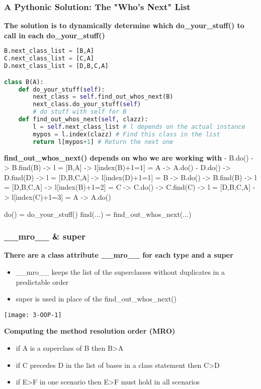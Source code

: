 \subsubsection{A Pythonic Solution: The "Who's Next" List}
\textbf{The solution is to dynamically determine which do\_your\_stuff() to call in each do\_your\_stuff()}

\begin{lstlisting}[language=Python]
B.next_class_list = [B,A]
C.next_class_list = [C,A]
D.next_class_list = [D,B,C,A]

class B(A):
	def do_your_stuff(self):
		next_class = self.find_out_whos_next(B)
		next_class.do_your_stuff(self)
		# do stuff with self for B
	def find_out_whos_next(self, clazz):
		l = self.next_class_list # l depends on the actual instance
		mypos = l.index(clazz) # Find this class in the list
		return l[mypos+1] # Return the next one
\end{lstlisting}

\textbf{find\_out\_whos\_next() depends on who we are working with}
- B.do() -> B.find(B) -> l = [B,A] ->  l[index(B)+1=1] = A ->  A.do()
- D.do() -> D.find(D) -> l = [D,B,C,A] -> l[index(D)+1=1] = B -> B.do()
         -> B.find(B) -> l = [D,B,C,A] -> l[index(B)+1=2] = C -> C.do()
         -> C.find(C) -> l = [D,B,C,A] -> l[index(C)+1=3] = A -> A.do()

do() = do\_your\_stuff() find(...) = find\_out\_whos\_next(...)

\subsubsection{\_\_mro\_\_ \& super}
\textbf{There are a class attribute \_\_mro\_\_ for each type and a super}
\begin{itemize}
	\item \_\_mro\_\_ keeps the list of the superclasses without duplicates in a
predictable order
	\item super is used in place of the find\_out\_whos\_next()
\end{itemize}

\begin{center}
\texttt{[image: 3-OOP-1]}
\end{center}

\textbf{Computing the method resolution order (MRO)}
\begin{itemize}
	\item if A is a superclass of B then B>A
	\item if C precedes D in the list of bases in a class statement then C>D
	\item if E>F in one scenario then E>F must hold in all scenarios
\end{itemize}

